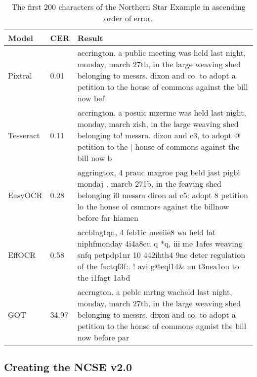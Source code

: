 \documentclass{article} %
\begin{document}
\begin{table*}
\caption{The first 200 characters of the Northern Star Example in ascending order of error.}
\label{tab:NS_example}
\small
\begin{tabular}{p{1.2cm}p{0.8cm}p{9cm}}
\hline
Model & CER & Result \\
\hline
Pixtral & 0.01 & accrington.  a public meeting was held last night, monday, march 27th, in the large weaving shed belonging to messrs. dixon and co. to adopt a petition to the house of commons against the bill now bef \\
Tesseract & 0.11 & accrington.  a posuic mzerme was held last night, monday, march zish, in the large weaving shed belonging to! messra. dizon and c3, to adopt @ petition to the | honse of commons against the bill now b \\
EasyOCR & 0.28 & aggringtox,  4 prauc mxgroe pag beld jast pigbì mondaj , marcb 271b, in the feaving shed belonging i0 messra diron ad c5: adopt 8 petition lo the honse ol csmmors against the billnow before far hiamen \\
EffOCR & 0.58 & accblngtqn, 4 feb1ic meeiie8 wa held lat niphfmonday 4i4a8eu q *q, iii me 1afes weaving snfq petpdp1nr 10  442ihth4 9ne deter regulation of the factqf3f:. ! avi g@eql14\& an t3nea1ou to the i1fagt 1abd \\
GOT & 34.97 & accrngton. a peblc mrtng wacheld last night, monday, march 27th, in the large weaving shed belonging to messrs. dixon and co. to adopt a petition to the honsc of commons agmist the bill now before par \\
\hline
\end{tabular}
\end{table*}

\subsection{Creating the NCSE v2.0}
\end{document}
